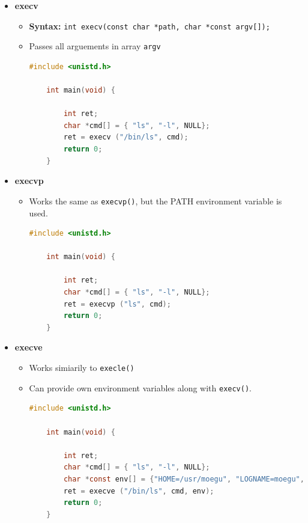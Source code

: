 \documentclass[12pt]{article}
\begin{document}
\begin{enumerate}[1.]
\begin{itemize}
        \item \textbf{execv}
        \begin{itemize}
            \item \textbf{Syntax:} \texttt{int execv(const char *path, char *const argv[]);}
            \item Passes all arguements in array \texttt{argv}

\begin{lstlisting}[language=c]
    #include <unistd.h>

    int main(void) {

        int ret;
        char *cmd[] = { "ls", "-l", NULL};
        ret = execv ("/bin/ls", cmd);
        return 0;
    }
\end{lstlisting}
        \end{itemize}

        \item \textbf{execvp}

        \begin{itemize}
            \item Works the same as \texttt{execvp()}, but the PATH environment variable is used.


\begin{lstlisting}[language=c]
    #include <unistd.h>

    int main(void) {

        int ret;
        char *cmd[] = { "ls", "-l", NULL};
        ret = execvp ("ls", cmd);
        return 0;
    }
\end{lstlisting}
        \end{itemize}
        \item \textbf{execve}
        \begin{itemize}
            \item Works simiarily to \texttt{execle()}
            \item Can provide own environment variables along with \texttt{execv()}.


\begin{lstlisting}[language=c]
    #include <unistd.h>

    int main(void) {

        int ret;
        char *cmd[] = { "ls", "-l", NULL};
        char *const env[] = {"HOME=/usr/moegu", "LOGNAME=moegu", NULL};
        ret = execve ("/bin/ls", cmd, env);
        return 0;
    }
\end{lstlisting}
        \end{itemize}
    \end{itemize}


\end{enumerate}
\end{document}
